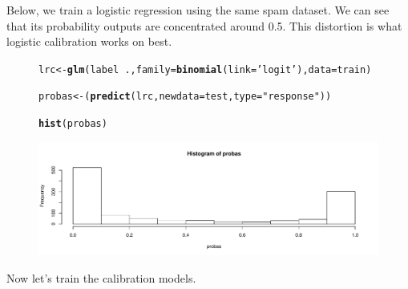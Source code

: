 \documentclass[oneside]{article}\usepackage[]{graphicx}\usepackage[]{color}
\makeatletter
\def\maxwidth{ %
  \ifdim\Gin@nat@width>\linewidth
    \linewidth
  \else
    \Gin@nat@width
  \fi
}
\newcommand{\hlstr}[1]{\textcolor[rgb]{0.192,0.494,0.8}{#1}}%
\newcommand{\hlopt}[1]{\textcolor[rgb]{0,0,0}{#1}}%
\newcommand{\hlstd}[1]{\textcolor[rgb]{0.345,0.345,0.345}{#1}}%
\newcommand{\hlkwb}[1]{\textcolor[rgb]{0.69,0.353,0.396}{#1}}%
\newcommand{\hlkwc}[1]{\textcolor[rgb]{0.333,0.667,0.333}{#1}}%
\newcommand{\hlkwd}[1]{\textcolor[rgb]{0.737,0.353,0.396}{\textbf{#1}}}%
\newenvironment{kframe}{%
 \def\at@end@of@kframe{}%
 \ifinner\ifhmode%
  \def\at@end@of@kframe{\end{minipage}}%
  \begin{minipage}{\columnwidth}%
 \fi\fi%
 \def\FrameCommand##1{\hskip\@totalleftmargin \hskip-\fboxsep
 \colorbox{shadecolor}{##1}\hskip-\fboxsep
     \hskip-\linewidth \hskip-\@totalleftmargin \hskip\columnwidth}%
 \MakeFramed {\advance\hsize-\width
   \@totalleftmargin\z@ \linewidth\hsize
   \@setminipage}}%
 {\par\unskip\endMakeFramed%
 \at@end@of@kframe}
\newenvironment{knitrout}{}{} %
\makeatother
\begin{document}
Below, we train a logistic regression using the same spam dataset. We can see that its probability outputs are concentrated around 0.5. This distortion is what logistic calibration works on best.

\begin{figure}[h]
\centering
\begin{mdframed}[userdefinedwidth=0.74\textwidth]
\begin{knitrout}
\color{fgcolor}\begin{kframe}
\begin{alltt}
\hlstd{lrc} \hlkwb{<-} \hlkwd{glm}\hlstd{(label}\hlopt{~}\hlstd{.,}\hlkwc{family}\hlstd{=}\hlkwd{binomial}\hlstd{(}\hlkwc{link}\hlstd{=}\hlstr{'logit'}\hlstd{),}\hlkwc{data}\hlstd{=train)}

\hlstd{probas} \hlkwb{<-} \hlstd{(}\hlkwd{predict}\hlstd{(lrc,} \hlkwc{newdata}\hlstd{=test,} \hlkwc{type}\hlstd{=}\hlstr{"response"}\hlstd{))}

\hlkwd{hist}\hlstd{(probas)}
\end{alltt}
\end{kframe}
\includegraphics[width=\maxwidth]{figure/intro_lrc-1} 

\end{knitrout}
\end{mdframed}
\end{figure}

Now let's train the calibration models.
\end{document}
